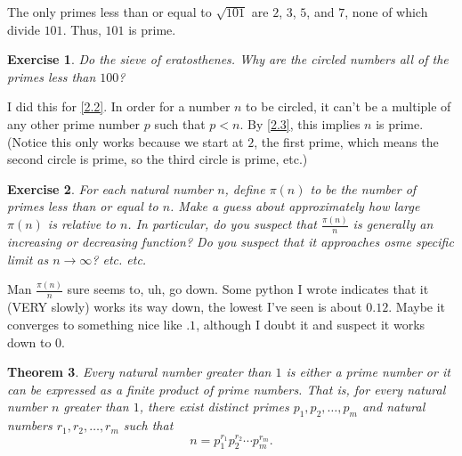 \documentclass{article}
\newtheorem{thm}{Theorem}[section]
\newtheorem{ex}[thm]{Exercise}
\numberwithin{equation}{thm}
\begin{document}
The only primes less than or equal to $\sqrt{101}$ are $2$, $3$, $5$, and $7$, none of which divide $101$. Thus, $101$ is prime.



\begin{ex} \label{2.5}
  Do the sieve of eratosthenes. Why are the circled numbers all of the primes less than $100$?
\end{ex}

I did this for \ref{2.2}. In order for a number $n$ to be circled, it can't be a multiple of any other prime number $p$ such that $p < n$. By \ref{2.3}, this implies $n$ is prime. (Notice this only works because we start at $2$, the first prime, which means the second circle is prime, so the third circle is prime, etc.)



\begin{ex} \label{2.6}
  For each natural number $n$, define $\pi (n)$ to be the number of primes less than or equal to $n$. Make a guess about approximately how large $\pi (n)$ is relative to $n$. In particular, do you suspect that $\frac{\pi (n)}{n}$ is generally an increasing or decreasing function? Do you suspect that it approaches osme specific limit as $n \to \infty$? etc. etc.
\end{ex}

Man $\frac{\pi (n)}{n}$ sure seems to, uh, go down. Some python I wrote indicates that it (VERY slowly) works its way down, the lowest I've seen is about $0.12$. Maybe it converges to something nice like $.1$, although I doubt it and suspect it works down to $0$.



 \begin{thm} \label{2.7}
   Every natural number greater than $1$ is either a prime number or it can be expressed as a finite product of prime numbers. That is, for every natural number $n$ greater than $1$, there exist distinct primes $p_1, p_2, \ldots, p_m$ and natural numbers $r_1,r_2,\ldots,r_m$ such that
   $$n = p_1^{r_1} p_2^{r_2} \cdots p_m^{r_m}.$$
 \end{thm}
\end{document}
